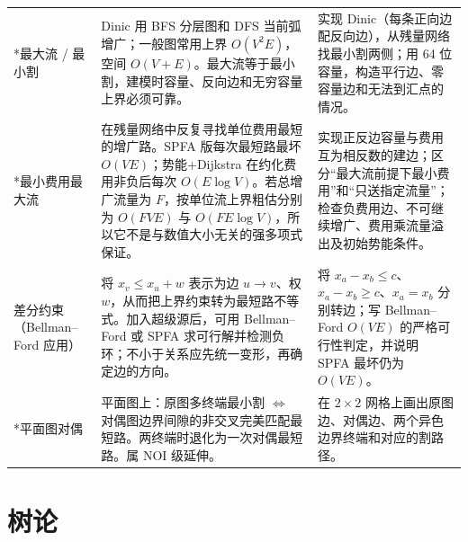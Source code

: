 \documentclass[a4paper,11pt]{article}
\begin{document}
\begin{longtable}{L{2.4cm} L{7.5cm} L{6.8cm}}
*最大流 / 最小割
& Dinic 用 BFS 分层图和 DFS 当前弧增广；一般图常用上界 $O(V^2E)$，空间 $O(V+E)$。最大流等于最小割，建模时容量、反向边和无穷容量上界必须可靠。
& 实现 Dinic（每条正向边配反向边），从残量网络找最小割两侧；用 64 位容量，构造平行边、零容量边和无法到汇点的情况。\\[2mm]

*最小费用最大流
& 在残量网络中反复寻找单位费用最短的增广路。SPFA 版每次最短路最坏 $O(VE)$；势能+Dijkstra 在约化费用非负后每次 $O(E\log V)$。若总增广流量为 $F$，按单位流上界粗估分别为 $O(FVE)$ 与 $O(FE\log V)$，所以它不是与数值大小无关的强多项式保证。
& 实现正反边容量与费用互为相反数的建边；区分“最大流前提下最小费用”和“只送指定流量”；检查负费用边、不可继续增广、费用乘流量溢出及初始势能条件。\\[2mm]

差分约束（Bellman--Ford 应用）
& 将 $x_v\le x_u+w$ 表示为边 $u\to v$、权 $w$，从而把上界约束转为最短路不等式。加入超级源后，可用 Bellman--Ford 或 SPFA 求可行解并检测负环；不小于关系应先统一变形，再确定边的方向。
& 将 $x_a-x_b\le c$、$x_a-x_b\ge c$、$x_a=x_b$ 分别转边；写 Bellman--Ford $O(VE)$ 的严格可行性判定，并说明 SPFA 最坏仍为 $O(VE)$。\\[2mm]

*平面图对偶
& 平面图上：原图多终端最小割 $\iff$ 对偶图边界间隙的非交叉完美匹配最短路。两终端时退化为一次对偶最短路。属 NOI 级延伸。
& 在 $2\times2$ 网格上画出原图边、对偶边、两个异色边界终端和对应的割路径。\\
\end{longtable}

\newpage
\section{树论}
\end{document}
